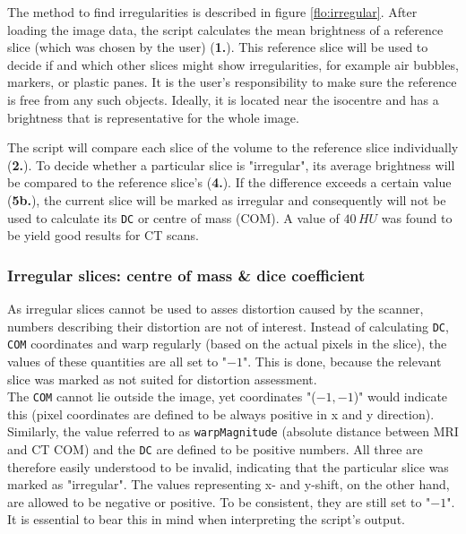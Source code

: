 The method to find irregularities is described in figure \ref{flo:irregular}.
After loading the image data, the script calculates the mean brightness of a reference slice (which was chosen by the user) (\textbf{1.}).
This reference slice will be used to decide if and which other slices might show irregularities, for example air bubbles, markers, or plastic panes.
It is the user's responsibility to make sure the reference is free from any such objects.
Ideally, it is located near the isocentre and has a brightness that is representative for the whole image.

The script will compare each slice of the volume to the reference slice individually (\textbf{2.}).
To decide whether a particular slice is "irregular", its average brightness will be compared to the reference slice's (\textbf{4.}).
If the difference exceeds a certain value (\textbf{5b.}), the current slice will be marked as irregular and consequently will not be used to calculate its \texttt{DC} or centre of mass (COM).
A value of $40\,HU$ was found to be yield good results for CT scans.


\subsubsection{Irregular slices: centre of mass \& dice coefficient}
As irregular slices cannot be used to asses distortion caused by the scanner, numbers describing their distortion are not of interest.
Instead of calculating \texttt{DC}, \texttt{COM} coordinates and warp regularly (based on the actual pixels in the slice), the values of these quantities are all set to "$-1$".
This is done, because the relevant slice was marked as not suited for distortion assessment. \\

The \texttt{COM} cannot lie outside the image, yet coordinates "($-1,-1$)" would indicate this (pixel coordinates are defined to be always positive in x and y direction).
Similarly, the value referred to as \texttt{warpMagnitude} (absolute distance between MRI and CT COM) and the \texttt{DC} are defined to be positive numbers.
All three are therefore easily understood to be invalid, indicating that the particular slice was marked as "irregular".
The values representing x- and y-shift, on the other hand, are allowed to be negative or positive.
To be consistent, they are still set to "$-1$".
It is essential to bear this in mind when interpreting the script's output.

